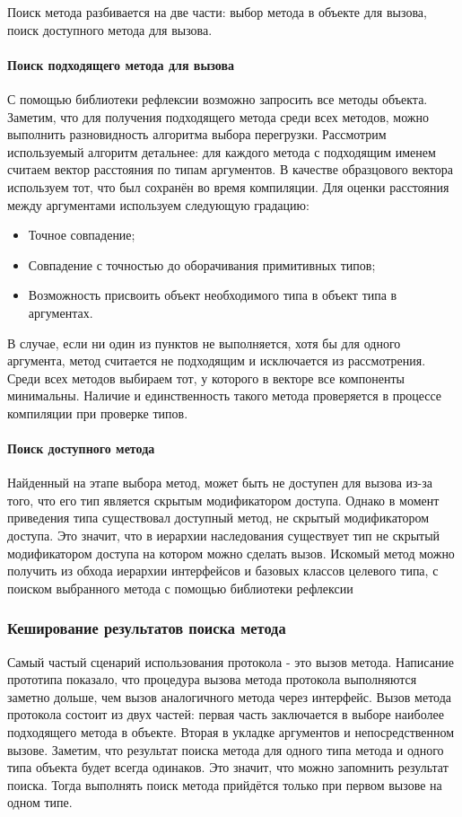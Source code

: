 Поиск метода разбивается на две части: выбор метода в объекте для вызова, поиск доступного метода для вызова.

\paragraph{Поиск подходящего метода для вызова}
С помощью библиотеки рефлексии возможно запросить все методы объекта. Заметим, что для получения подходящего метода среди всех методов, можно выполнить разновидность алгоритма выбора перегрузки. Рассмотрим используемый алгоритм детальнее: для каждого метода с подходящим именем считаем вектор расстояния по типам аргументов. В качестве образцового вектора используем тот, что был сохранён во время компиляции. Для оценки расстояния между аргументами используем следующую градацию:

\begin{itemize}
    \item Точное совпадение;
    \item Совпадение с точностью до оборачивания примитивных типов;
    \item Возможность присвоить объект необходимого типа в объект типа в аргументах.
\end{itemize}

В случае, если ни один из пунктов не выполняется, хотя бы для одного аргумента, метод считается не подходящим и исключается из рассмотрения. Среди всех методов выбираем тот, у которого в векторе все компоненты минимальны. Наличие и единственность такого метода проверяется в процессе компиляции при проверке типов.

\paragraph{Поиск доступного метода}
Найденный на этапе выбора метод, может быть не доступен для вызова из-за того, что его тип является скрытым модификатором доступа. Однако в момент приведения типа существовал доступный метод, не скрытый модификатором доступа. Это значит, что в иерархии наследования существует тип не скрытый модификатором доступа на котором можно сделать вызов. Искомый метод можно получить из обхода иерархии интерфейсов и базовых классов целевого типа, с поиском выбранного метода с помощью библиотеки рефлексии

\subsubsection{Кеширование результатов поиска метода}
Самый частый сценарий использования протокола - это вызов метода. Написание прототипа показало, что процедура вызова метода протокола выполняются заметно дольше, чем вызов аналогичного метода через интерфейс. Вызов метода протокола состоит из двух частей: первая часть заключается в выборе наиболее подходящего метода в объекте. Вторая в укладке аргументов и непосредственном вызове. Заметим, что результат поиска метода для одного типа метода и одного типа объекта будет всегда одинаков. Это значит, что можно запомнить результат поиска. Тогда выполнять поиск метода прийдётся только при первом вызове на одном типе.

